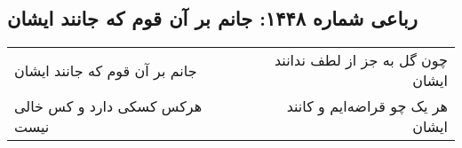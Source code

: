 \begin{center}
\section*{رباعی شماره ۱۴۴۸: جانم بر آن قوم که جانند ایشان}
\label{sec:1448}
\begin{longtable}{l p{0.5cm} r}
جانم بر آن قوم که جانند ایشان
&&
چون گل به جز از لطف ندانند ایشان
\\
هرکس کسکی دارد و کس خالی نیست
&&
هر یک چو قراضه‌ایم و کانند ایشان
\\
\end{longtable}
\end{center}
